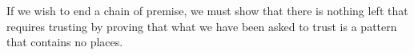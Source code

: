 If we wish to end a chain of premise, we must show that there is nothing left
that requires trusting by proving that what we have been asked to trust is
a pattern that contains no places.
\begin{code}%
\>[0]\AgdaSpace{}%
\AgdaSpace{}%
\AgdaSymbol{(}\AgdaSpace{}%
\AgdaSpace{}%
\AgdaSymbol{:}\AgdaSpace{}%
\AgdaSpace{}%
\AgdaSymbol{)}\AgdaSpace{}%
\AgdaSymbol{:}\AgdaSpace{}%
\AgdaSymbol{(}\AgdaSpace{}%
\AgdaSymbol{:}\AgdaSpace{}%
\AgdaSpace{}%
\AgdaSymbol{)}\AgdaSpace{}%
\AgdaSpace{}%
\AgdaSpace{}%
\<%
\\
\>[0][@{}l@{\AgdaIndent{0}}]%
\>[2]%
\>[7]\AgdaSymbol{:}%
\>[10]\AgdaSymbol{(}\AgdaSpace{}%
\AgdaSymbol{)}\AgdaSpace{}%
\AgdaSpace{}%
\AgdaSpace{}%
\AgdaSpace{}%
\AgdaSpace{}%
\<%
\\
%
\>[2]%
\>[7]\AgdaSymbol{:}%
\>[10]\AgdaSpace{}%
\AgdaSpace{}%
\AgdaSpace{}%
\AgdaSpace{}%
\AgdaSpace{}%
\AgdaSpace{}%
\<%
\\
%
\>[10]\AgdaSpace{}%
\AgdaSymbol{(}\AgdaSpace{}%
\AgdaSpace{}%
\AgdaSymbol{)}\AgdaSpace{}%
\AgdaSpace{}%
\AgdaSpace{}%
\<%
\\
%
\>[10]\AgdaSpace{}%
\AgdaSpace{}%
\AgdaSpace{}%
\<%
\\
%
\\[\AgdaEmptyExtraSkip]%
\>[0]\AgdaSpace{}%
\AgdaSymbol{:}\AgdaSpace{}%
\AgdaSymbol{(}\AgdaSpace{}%
\AgdaSymbol{:}\AgdaSpace{}%
\AgdaSymbol{)}\AgdaSpace{}%
\AgdaSpace{}%
\AgdaSpace{}%
\AgdaSpace{}%
\AgdaSpace{}%
\AgdaSpace{}%
\AgdaSpace{}%
\AgdaSpace{}%
\AgdaSymbol{(}\AgdaSpace{}%
\AgdaSpace{}%
\AgdaSymbol{)}\AgdaSpace{}%
\AgdaSymbol{(}\AgdaSpace{}%
\AgdaSpace{}%
\AgdaSymbol{)}\AgdaSpace{}%
\AgdaSymbol{(}\AgdaSpace{}%
\AgdaSpace{}%
\AgdaSymbol{)}\<%
\end{code}

